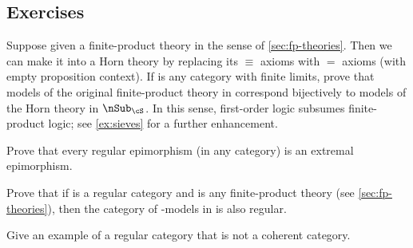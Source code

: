 \subsection*{Exercises}

\begin{ex}\label{ex:fptheory-horn}
  Suppose given a finite-product theory in the sense of \cref{sec:fp-theories}.
  Then we can make it into a Horn theory by replacing its $\equiv$ axioms with $=$ axioms (with empty proposition context).
  If \cS is any category with finite limits, prove that models of the original finite-product theory in \cS correspond bijectively to models of the Horn theory in $\sub_\cS$.
  In this sense, first-order logic subsumes finite-product logic; see \cref{ex:sieves} for a further enhancement.
\end{ex}

\begin{ex}\label{ex:regular-epis}
  Prove that every regular epimorphism (in any category) is an extremal epimorphism.
\end{ex}

\begin{ex}\label{ex:regular-egs}
  Prove that if \cS is a regular category and \cT is any finite-product theory (see \cref{sec:fp-theories}), then the category of \cT-models in \cS is also regular.
\end{ex}

\begin{ex}\label{ex:regular-not-coherent}
  Give an example of a regular category that is not a coherent category.
\end{ex}

